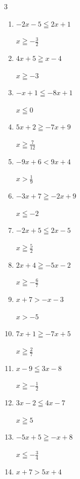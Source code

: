 \begin{multicols}{3}
\begin{enumerate}
        $\displaystyle x\leqq \frac{4}{5}$

  \item $-2x-5\leqq 2x+1$

        $\displaystyle x\geqq -\frac{3}{2}$

\columnbreak %

  \item $4x+5\geqq x-4$

        $\displaystyle x\geqq -3$

  \item $-x+1\leqq -8x+1$

        $\displaystyle x\leqq 0$

  \item $5x+2\geqq -7x+9$

        $\displaystyle x\geqq \frac{7}{12}$

  \item $-9x+6<9x+4$

        $\displaystyle x>\frac{1}{9}$

  \item $-3x+7\geqq -2x+9$

        $\displaystyle x\leqq -2$

  \item $-2x+5\leqq 2x-5$

        $\displaystyle x\geqq \frac{5}{2}$

  \item $2x+4\geqq -5x-2$

        $\displaystyle x\geqq -\frac{6}{7}$

  \item $x+7>-x-3$

        $\displaystyle x>-5$

  \item $7x+1\geqq -7x+5$

        $\displaystyle x\geqq \frac{2}{7}$

  \item $x-9\leqq 3x-8$

        $\displaystyle x\geqq -\frac{1}{2}$

  \item $3x-2\leqq 4x-7$

        $\displaystyle x\geqq 5$

  \item $-5x+5\geqq -x+8$

        $\displaystyle x\leqq -\frac{3}{4}$

  \item $x+7>5x+4$


\end{enumerate}
\end{multicols}

